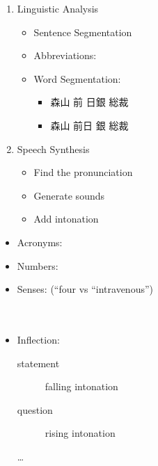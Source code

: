 \documentclass[a4paper,landscape,headrule,footrule,xetex]{foils}
\begin{document}

\begin{enumerate}
\item Linguistic Analysis
  \begin{itemize}
  \item Sentence Segmentation
  \item Abbreviations: 
  \item Word Segmentation: 
    \begin{itemize}
    \item 森山 前 日銀 総裁 
    \item[\Bad]  森山 前日 銀 総裁　
      \end{itemize}
    \end{itemize}
\item Speech Synthesis
  \begin{itemize}
  \item Find the pronunciation
  \item Generate sounds
  \item Add intonation
  \end{itemize}
\end{enumerate}


\begin{itemize}
\item Acronyms: 
\item Numbers: 
\item Senses:  (``four vs ``intravenous'')
  \\ 
\\ 
\\ 
\item Inflection:
  \begin{description}
  \item[statement] falling intonation
  \item[question] rising intonation
  \item[{\ldots}]
  \end{description}
\end{itemize}
\end{document}
